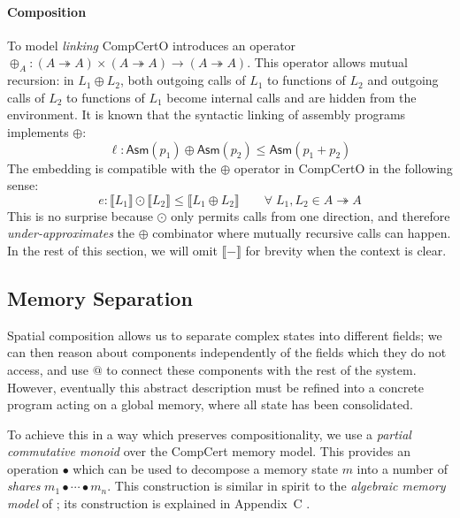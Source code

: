 \documentclass[acmsmall,nonacm]{acmart}
\newcommand{\kw}[1]{\ensuremath{ \mathsf{#1} }}
\begin{document}
\paragraph{Composition}
To model \textit{linking}
CompCertO introduces
an operator
$\oplus_A : (A \twoheadrightarrow A) \times (A \twoheadrightarrow A) \rightarrow (A \twoheadrightarrow A)$.
This operator allows
mutual recursion:
in $L_1 \oplus L_2$,
both outgoing calls of $L_1$ to functions of $L_2$
and outgoing calls of $L_2$ to functions of $L_1$
become internal calls
and are hidden from the environment.
It is known that
the syntactic linking
of assembly programs
implements $\oplus$:
\[
  \ell :
  \kw{Asm}(p_1) \oplus \kw{Asm}(p_2) \le
  \kw{Asm}(p_1 + p_2)
\]%
The embedding is compatible
with the $\oplus$ operator in CompCertO
in the following sense:
\[
  \mathit{e}: \llbracket L_1 \rrbracket \odot \llbracket L_2 \rrbracket
    \le  \llbracket L_1 \oplus L_2 \rrbracket
  \qquad \forall \; L_1, L_2 \in A \twoheadrightarrow A
\]
This is no surprise because
$\odot$ only permits calls
from one direction,
and therefore \emph{under-approximates}
the $\oplus$ combinator
where mutually recursive calls can happen.
In the rest of this section,
we will omit $\llbracket - \rrbracket$
for brevity
when the context is clear.

\subsection{Memory Separation}
\label{sec:application:sepalg} %

Spatial composition
allows us to separate
complex states into different fields;
we can then reason about components
independently of the fields which they do not access,
and use $\mathbin@$
to connect these components with the rest of the system.
However, eventually this abstract description
must be refined into a concrete program
acting on a global memory,
where all state has been consolidated.

To achieve this in a way which preserves compositionality,
we use a \emph{partial commutative monoid}
over the CompCert memory model.
This provides an operation $\bullet$
which can be used to decompose a memory state $m$ into
a number of \emph{shares}
$
  m_1 \bullet \cdots \bullet m_n
$.
This construction
is similar in spirit to the \emph{algebraic memory model}
of \citet{ccal};
its construction is explained in Appendix~C \citep{compcertoe-tr}.
\end{document}
